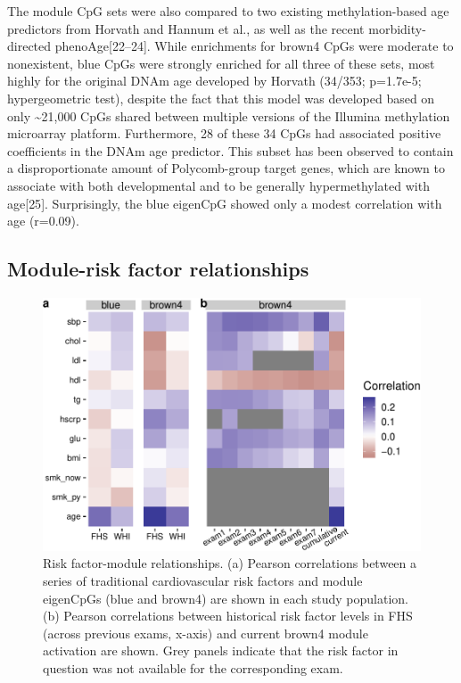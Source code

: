 \documentclass[]{article}
\theoremstyle{definition}
\theoremstyle{definition}
\theoremstyle{definition}
\theoremstyle{remark}
\begin{document}
The module CpG sets were also compared to two existing methylation-based
age predictors from Horvath and Hannum et al., as well as the recent
morbidity-directed phenoAge{[}22--24{]}. While enrichments for brown4
CpGs were moderate to nonexistent, blue CpGs were strongly enriched for
all three of these sets, most highly for the original DNAm age developed
by Horvath (34/353; p=1.7e-5; hypergeometric test), despite the fact
that this model was developed based on only \textasciitilde{}21,000 CpGs
shared between multiple versions of the Illumina methylation microarray
platform. Furthermore, 28 of these 34 CpGs had associated positive
coefficients in the DNAm age predictor. This subset has been observed to
contain a disproportionate amount of Polycomb-group target genes, which
are known to associate with both developmental and to be generally
hypermethylated with age{[}25{]}. Surprisingly, the blue eigenCpG showed
only a modest correlation with age (r=0.09).

\subsection{Module-risk factor
relationships}\label{module-risk-factor-relationships}

\begin{figure}[htbp]
\centering
\includegraphics{../doc/module_ewas/figures/risk-factor-correlation-plots-1.pdf}
\caption{\label{fig:risk-factor-correlation-plots}Risk factor-module
relationships. (a) Pearson correlations between a series of traditional
cardiovascular risk factors and module eigenCpGs (blue and brown4) are
shown in each study population. (b) Pearson correlations between
historical risk factor levels in FHS (across previous exams, x-axis) and
current brown4 module activation are shown. Grey panels indicate that
the risk factor in question was not available for the corresponding
exam.}
\end{figure}
\end{document}
